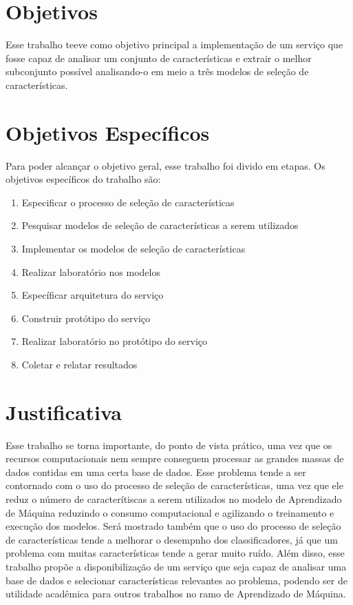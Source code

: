 \section{Objetivos}

Esse trabalho teeve como objetivo principal a implementação de um serviço que fosse capaz de analisar um conjunto de características e extrair o melhor subconjunto possível analisando-o em meio a três modelos de seleção de características.

\section{Objetivos Específicos}

Para poder alcançar o objetivo geral, esse trabalho foi divido em etapas. Os objetivos específicos do trabalho são:

\begin{enumerate}
	\item{Especificar o processo de seleção de características}
	\item{Pesquisar modelos de seleção de características a serem utilizados}
	\item{Implementar os modelos de seleção de características}
	\item{Realizar laboratório nos modelos}
	\item{Específicar arquitetura do serviço}
	\item{Construir protótipo do serviço}
	\item{Realizar laboratório no protótipo do serviço}
	\item{Coletar e relatar resultados}
\end{enumerate}


\section{Justificativa}

Esse trabalho se torna importante, do ponto de vista prático, uma vez que os recursos computacionais nem sempre conseguem processar as grandes massas de dados contidas em uma certa base de dados. Esse problema tende a ser contornado com o uso do processo de seleção de características, uma vez que ele reduz o número de caracterítiscas a serem utilizados no modelo de Aprendizado de Máquina reduzindo o consumo computacional e agilizando o treinamento e execução dos modelos. Será mostrado também que o uso do processo de seleção de características tende a melhorar o desempnho dos classificadores, já que um problema com muitas características tende a gerar muito ruído. Além disso, esse trabalho propõe a disponibilização de um serviço que seja capaz de analisar uma base de dados e selecionar características relevantes ao problema, podendo ser de utilidade acadêmica para outros trabalhos no ramo de Aprendizado de Máquina.


